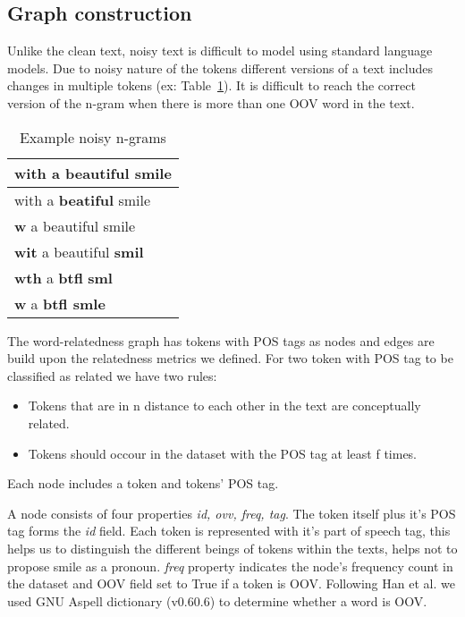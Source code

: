 \subsection{Graph construction}
Unlike the clean text, noisy text is difficult to model using standard language models. Due to noisy nature of the tokens different versions of a text includes changes in multiple tokens (ex: Table~\ref{tab:ngrams}). It is difficult to reach the correct version of the n-gram when there is more than one OOV word in the text.
\begin{table}[tbhp]
\begin{centering}
\begin{tabular}[h]{l}
\hline
with a beautiful smile \\
\hline
with a \textbf{beatiful} smile \\
\textbf{w} a beautiful smile \\
\textbf{wit} a beautiful \textbf{smil} \\
\textbf{wth} a \textbf{btfl} \textbf{sml} \\
\textbf{w} a \textbf{btfl smle} \\
\hline
\end{tabular}
\par\end{centering}
\caption{Example noisy n-grams}
\label{tab:ngrams}
\end{table}

The word-relatedness graph has tokens with POS tags as nodes and edges are build upon the relatedness metrics we defined. For two token with POS tag to be classified as related we have two rules:
\begin{itemize}
\item Tokens that are in n distance to each other in the text are conceptually related.
\item Tokens should occour in the dataset with the POS tag at least f times.
\end{itemize}


 \par

Each node includes a token and tokens' POS tag.

A node consists of four properties \textit{id, ovv, freq, tag}. The token itself plus it's POS tag forms the \textit{id} field. Each token is represented with it's part of speech tag, this helps us to distinguish the different beings of tokens within the texts, helps not to propose smile as a pronoun. \textit{freq} property indicates the node's frequency count in the dataset and OOV field set to True if a token is OOV. Following Han et al. we used GNU Aspell dictionary (v0.60.6) to determine whether a word is OOV.

